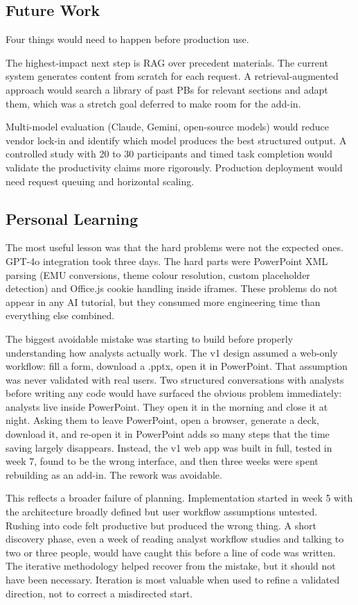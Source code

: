 \subsection{Future Work}

Four things would need to happen before production use.

The highest-impact next step is RAG over precedent materials. The current system generates content from scratch for each request. A retrieval-augmented approach would search a library of past PBs for relevant sections and adapt them, which was a stretch goal deferred to make room for the add-in.

Multi-model evaluation (Claude, Gemini, open-source models) would reduce vendor lock-in and identify which model produces the best structured output. A controlled study with 20 to 30 participants and timed task completion would validate the productivity claims more rigorously. Production deployment would need request queuing and horizontal scaling.

\subsection{Personal Learning}

The most useful lesson was that the hard problems were not the expected ones. GPT-4o integration took three days. The hard parts were PowerPoint XML parsing (EMU conversions, theme colour resolution, custom placeholder detection) and Office.js cookie handling inside iframes. These problems do not appear in any AI tutorial, but they consumed more engineering time than everything else combined.

The biggest avoidable mistake was starting to build before properly understanding how analysts actually work. The v1 design assumed a web-only workflow: fill a form, download a .pptx, open it in PowerPoint. That assumption was never validated with real users. Two structured conversations with analysts before writing any code would have surfaced the obvious problem immediately: analysts live inside PowerPoint. They open it in the morning and close it at night. Asking them to leave PowerPoint, open a browser, generate a deck, download it, and re-open it in PowerPoint adds so many steps that the time saving largely disappears. Instead, the v1 web app was built in full, tested in week 7, found to be the wrong interface, and then three weeks were spent rebuilding as an add-in. The rework was avoidable.

This reflects a broader failure of planning. Implementation started in week 5 with the architecture broadly defined but user workflow assumptions untested. Rushing into code felt productive but produced the wrong thing. A short discovery phase, even a week of reading analyst workflow studies and talking to two or three people, would have caught this before a line of code was written. The iterative methodology helped recover from the mistake, but it should not have been necessary. Iteration is most valuable when used to refine a validated direction, not to correct a misdirected start.

